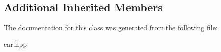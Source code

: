 \subsection*{Additional Inherited Members}


The documentation for this class was generated from the following file\+:\begin{DoxyCompactItemize}
\item 
car.\+hpp\end{DoxyCompactItemize}
